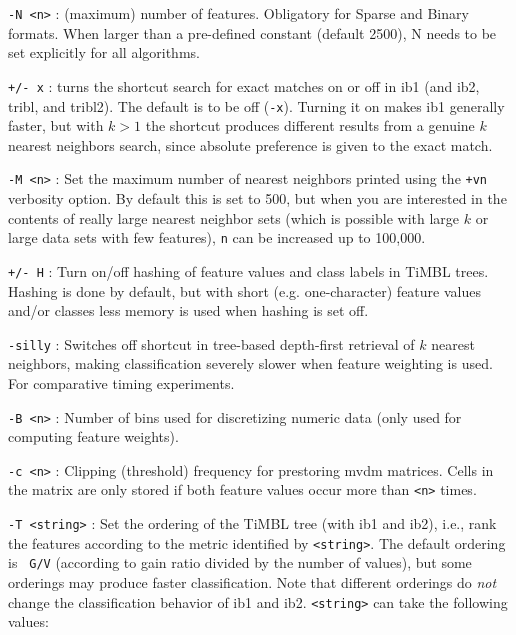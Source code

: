 \documentclass{report}
\begin{document}
\begin{description}

\item {\tt -N <n>} : (maximum) number of features. Obligatory for
  Sparse and Binary formats. When larger than a pre-defined constant
  (default 2500), N needs to be set explicitly for all algorithms.

\item {\tt +/- x} : turns the shortcut search for exact matches on or
  off in {\sc ib1} (and {\sc ib2}, {\sc tribl}, and {\sc tribl2}). The
  default is to be off ({\tt -x}). Turning it on makes {\sc ib1}
  generally faster, but with $k>1$ the shortcut produces different
  results from a genuine $k$ nearest neighbors search, since absolute
  preference is given to the exact match.

\item {\tt -M <n>} : Set the maximum number of nearest neighbors
  printed using the {\tt +vn} verbosity option. By default this is set
  to 500, but when you are interested in the contents of really large
  nearest neighbor sets (which is possible with large $k$ or large
  data sets with few features), {\tt n} can be increased up to
  100,000.

\item {\tt +/- H} : Turn on/off hashing of feature values and class
  labels in TiMBL trees. Hashing is done by default, but with short
  (e.g. one-character) feature values and/or classes less memory is
  used when hashing is set off.

\item {\tt -silly} : Switches off shortcut in tree-based depth-first
  retrieval of $k$ nearest neighbors, making classification severely
  slower when feature weighting is used. For comparative timing
  experiments.

\item {\tt -B <n>} : Number of bins used for discretizing numeric data
  (only used for computing feature weights).

\item {\tt -c <n>} : Clipping (threshold) frequency for prestoring
  {\sc mvdm} matrices. Cells in the matrix are only stored if both
  feature values occur more than {\tt <n>} times.

\item {\tt -T <string>} : Set the ordering of the TiMBL tree (with
  {\sc ib1} and {\sc ib2}), i.e., rank the features according to the
  metric identified by {\tt <string>}. The default ordering is {\tt
    G/V} (according to gain ratio divided by the number of values),
  but some orderings may produce faster classification. Note that
  different orderings do {\em not}\/ change the classification
  behavior of {\sc ib1} and {\sc ib2}. {\tt <string>} can take the
  following values:


\end{description}
\end{document}
